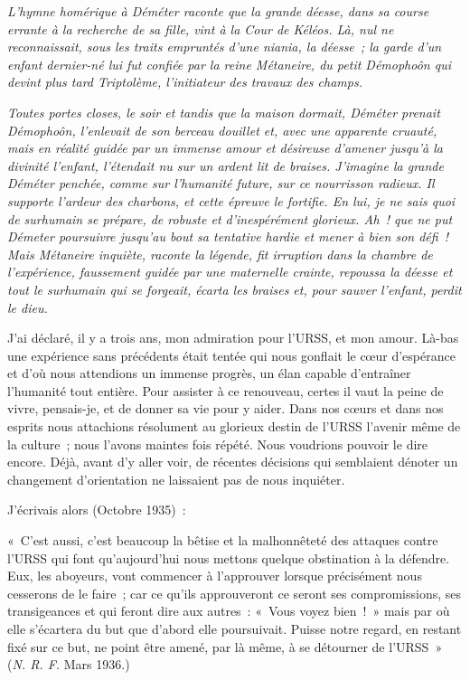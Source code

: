 \documentclass[twoside]{book} %
\newenvironment{quoteblock}
  {\begin{quoting}\setstretch{0.9}} %
  {\end{quoting}}
\newcommand{\quoteskip}{\medskip}
\newcommand\chaptercont{} %
\newenvironment{quotebar}{%
    \def\FrameCommand{{\color{rubric!10!}\vrule width 0.5em} \hspace{0.9em}}%
    \def\OuterFrameSep{0pt} %
    \MakeFramed {\advance\hsize-\width \FrameRestore}
  }%
  {%
    \endMakeFramed
  }
\renewenvironment{quoteblock}%
  {%
    \savenotes
    \setstretch{0.9}
    \begin{quotebar}
    \smallskip
  }
  {%
    \smallskip
    \end{quotebar}
    \spewnotes
  }
\begin{document}
\chaptercont
{\itshape \noindent L’hymne homérique à Déméter raconte que la grande déesse, dans sa course errante à la recherche de sa fille, vint à la Cour de Kéléos. Là, nul ne reconnaissait, sous les traits empruntés d’une niania, la déesse ; la garde d’un enfant dernier-né lui fut confiée par la reine Métaneire, du petit Démophoôn qui devint plus tard Triptolème, l’initiateur des travaux des champs.\par}
{\itshape Toutes portes closes, le soir et tandis que la maison dormait, Déméter prenait Démophoôn, l’enlevait de son berceau douillet et, avec une apparente cruauté, mais en réalité guidée par un immense amour et désireuse d’amener jusqu’à la divinité l’enfant, l’étendait nu sur un ardent lit de braises. J’imagine la grande Déméter penchée, comme sur l’humanité future, sur ce nourrisson radieux. Il supporte l’ardeur des charbons, et cette épreuve le fortifie. En lui, je ne sais quoi de surhumain se prépare, de robuste et d’inespérément glorieux. Ah ! que ne put Démeter poursuivre jusqu’au bout sa tentative hardie et mener à bien son défi ! Mais Métaneire inquiète, raconte la légende, fit irruption dans la chambre de l’expérience, faussement guidée par une maternelle crainte, repoussa la déesse et tout le surhumain qui se forgeait, écarta les braises et, pour sauver l’enfant, perdit le dieu.\par}
J’ai déclaré, il y a trois ans, mon admiration pour l’URSS, et mon amour. Là-bas une expérience sans précédents était tentée qui nous gonflait le cœur d’espérance et d’où nous attendions un immense progrès, un élan capable d’entraîner l’humanité tout entière. Pour assister à ce renouveau, certes il vaut la peine de vivre, pensais-je, et de donner sa vie pour y aider. Dans nos cœurs et dans nos esprits nous attachions résolument au glorieux destin de l’URSS l’avenir même de la culture ; nous l’avons maintes fois répété. Nous voudrions pouvoir le dire encore. Déjà, avant d’y aller voir, de récentes décisions qui semblaient dénoter un changement d’orientation ne laissaient pas de nous inquiéter.\par
J’écrivais alors (Octobre 1935) :\par
\quoteskip\begin{quoteblock}
 \noindent « C’est aussi, c’est beaucoup la bêtise et la malhonnêteté des attaques contre l’URSS qui font qu’aujourd’hui nous mettons quelque obstination à la défendre. Eux, les aboyeurs, vont commencer à l’approuver lorsque précisément nous cesserons de le faire ; car ce qu’ils approuveront ce seront ses compromissions, ses transigeances et qui feront dire aux autres : « Vous voyez bien ! » mais par où elle s’écartera du but que d’abord elle poursuivait. Puisse notre regard, en restant fixé sur ce but, ne point être amené, par là même, à se détourner de l’URSS » (\emph{N. R. F.} Mars 1936.)
\end{quoteblock}\quoteskip
\end{document}
